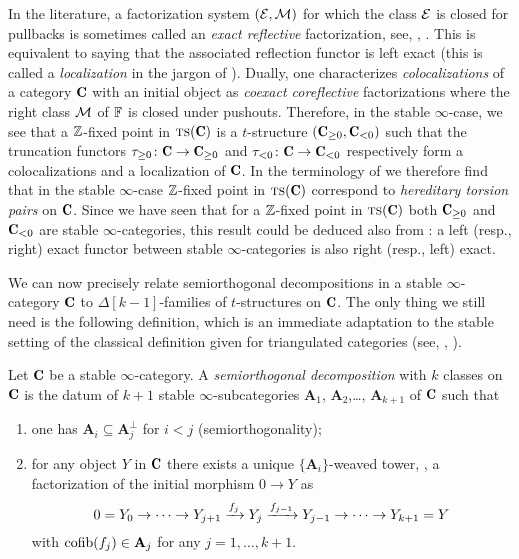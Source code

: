 \documentclass[a4paper,12pt]{amsart}
\renewcommand{\textbf}[1]{\text{\fontseries{b}\selectfont{\upshape #1}}}
\begin{document}
\begin{remark}\label{oss.hereditary}
In the literature, a factorization system $(\mathcal{E},\mathcal{M})$ for which the class $\mathcal{E}$ is closed for pullbacks is sometimes called an \emph{exact reflective} factorization, see, \eg, \cite{CHK}. This is equivalent to saying that the associated reflection functor is left exact (this is called a \emph{localization} in the jargon of \cite{CHK}). Dually,  one characterizes \emph{colocalizations} of a category $\C$ with an initial object as \emph{coexact coreflective} factorizations where the right class $\mathcal{M}$ of $\mathbb{F}$ is closed under pushouts.  Therefore, in the stable $\infty$-case, we see that a $\mathbb{Z} $-fixed point in $\ts(\C)$ is a $t$-structure $(\C_{\geq 0},\C_{<0})$ such that the truncation functors $\tau_{\ge 0}\colon \C\to \C_{\ge 0}$ and $\tau_{<0}\colon \C\to \C_{<0}$ respectively form a colocalizations and a localization of $\C$. In the terminology of \cite{Beligiannisreiten} we therefore find that in the stable $\infty$-case $\mathbb{Z} $-fixed point in $\ts(\C)$ correspond to \emph{hereditary torsion pairs} on $\C$. Since we have seen that for a $\mathbb{Z} $-fixed point in $\ts(\C)$ both $\C_{\geq 0}$ and $\C_{<0}$ are stable $\infty$-categories, this result could be deduced also from \cite[Prop. \textbf{1.1.4.1}]{LurieHA}: a left (resp., right) exact functor between stable $\infty$-categories is also right (resp., left) exact.
 \end{remark}
We can now precisely relate semiorthogonal decompositions in a stable $\infty$-category $\C$ to $\Delta[k-1]$-families of $t$-structures on $\C$. The only thing we still need is the following definition, which is an immediate adaptation to the stable setting of the classical definition given for triangulated categories (see, \eg, \cite{Bondal1995, Kuz} ).
\begin{definition}
Let $\C$ be a stable $\infty$-category. A \emph{semiorthogonal decomposition} with $k$ classes on $\C$ is the datum of $k+1$ stable $\infty$-subcategories $\mathbf{A}_1$, $\mathbf{A}_2$,\dots, $\mathbf{A}_{k+1}$ of $\C$ such that
\begin{enumerate}
\item one has $\mathbf{A}_i\subseteq \mathbf{A}_j^\perp$ for $i<j$ (semiorthogonality);
\item for any object $Y$ in $\C$ there exists a unique $\{\mathbf{A}_i\}$-weaved tower, \ie, a factorization of the initial morphism $0\to Y$ as 
\[
0 =Y_0\to\cdots \to Y_{j+1} \xrightarrow{f_{j}} Y_{j} \xrightarrow{f_{j-1}}Y_{j-1}\to \cdots\to Y_{k+1}=Y
\]
with $\operatorname{cofib}(f_j)\in \mathbf{A}_j$ for any $j=1,\dots, k+1$. 
\end{enumerate} 
\end{definition}
\end{document}
